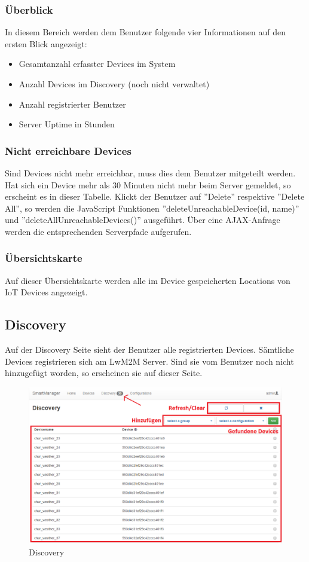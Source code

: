 \subsubsection{Überblick}
In diesem Bereich werden dem Benutzer folgende vier Informationen auf den ersten Blick angezeigt:
\begin{itemize}
\item Gesamtanzahl erfasster Devices im System
\item Anzahl Devices im Discovery (noch nicht verwaltet)
\item Anzahl registrierter Benutzer
\item Server Uptime in Stunden
\end{itemize}

\subsubsection{Nicht erreichbare Devices}
Sind Devices nicht mehr erreichbar, muss dies dem Benutzer mitgeteilt werden. Hat sich ein Device mehr als 30 Minuten nicht mehr beim Server gemeldet, so erscheint es in dieser Tabelle. Klickt der Benutzer auf ''Delete'' respektive ''Delete All'', so werden die JavaScript Funktionen ''deleteUnreachableDevice(id, name)'' und ''deleteAllUnreachableDevices()'' ausgeführt. Über eine AJAX-Anfrage werden die entsprechenden Serverpfade aufgerufen.

\subsubsection{Übersichtskarte}
Auf dieser Übersichtskarte werden alle im Device gespeicherten Locations von IoT Devices angezeigt.

\newpage
\subsection{Discovery}
Auf der Discovery Seite sieht der Benutzer alle registrierten Devices. Sämtliche Devices registrieren sich am LwM2M Server. Sind sie vom Benutzer noch nicht hinzugefügt worden, so erscheinen sie auf dieser Seite.

\begin{figure}[H]
\centering
\includegraphics[scale=0.57]{../04_Realisierung/images/userinterface/discovery.png}
\caption{Discovery}
\end{figure}

